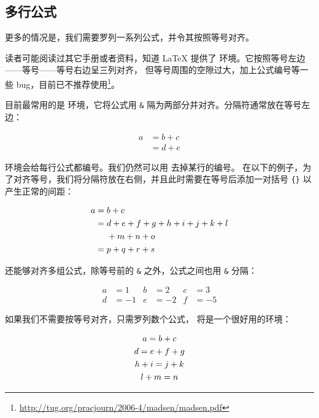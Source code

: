 \subsection{多行公式}\label{subsec:align}

更多的情况是，我们需要罗列一系列公式，并令其按照等号对齐。

读者可能阅读过其它手册或者资料，知道 \LaTeX{} 提供了  环境。它按照等号左边——等号——等号右边呈三列对齐，
但等号周围的空隙过大，加上公式编号等一些 bug，目前已不推荐使用\footnote{\url{http://tug.org/pracjourn/2006-4/madsen/madsen.pdf}}。

目前最常用的是  环境，它将公式用 \texttt\& 隔为两部分并对齐。分隔符通常放在等号左边：
\begin{example}
\begin{align}
a & = b + c \\
& = d + e
\end{align}
\end{example}

 环境会给每行公式都编号。我们仍然可以用  去掉某行的编号。
在以下的例子，为了对齐等号，我们将分隔符放在右侧，并且此时需要在等号后添加一对括号 \texttt\{\texttt\} 以产生正常的间距：
\begin{example}
\begin{align}
a ={} & b + c \\
  ={} & d + e + f + g + h + i
        + j + k + l \notag \\
      & + m + n + o \\
  ={} & p + q + r + s
\end{align}
\end{example}

 还能够对齐多组公式，除等号前的 \texttt\& 之外，公式之间也用 \texttt\& 分隔：
\begin{example}
\begin{align}
a &=1  &  b &=2   & c &=3   \\
d &=-1 &  e &=-2  & f &=-5
\end{align}
\end{example}

如果我们不需要按等号对齐，只需罗列数个公式， 将是一个很好用的环境：
\begin{example}
\begin{gather}
a = b + c \\
d = e + f + g \\
h + i = j + k \notag \\
l + m = n
\end{gather}
\end{example}

